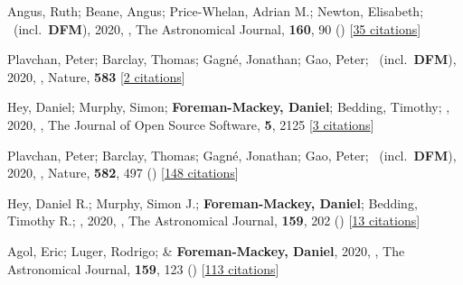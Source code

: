 \item[{\color{numcolor}\scriptsize58}] Angus, Ruth; Beane, Angus; Price-Whelan, Adrian M.; Newton, Elisabeth; \etal\ (incl.\ \textbf{DFM}), 2020, , The Astronomical Journal, \textbf{160}, 90 () [\href{https://ui.adsabs.harvard.edu/abs/2020AJ....160...90A}{35 citations}]

\item[{\color{numcolor}\scriptsize57}] Plavchan, Peter; Barclay, Thomas; Gagn{\'e}, Jonathan; Gao, Peter; \etal\ (incl.\ \textbf{DFM}), 2020, , Nature, \textbf{583} [\href{https://ui.adsabs.harvard.edu/abs/2020Natur.583E..31P}{2 citations}]

\item[{\color{numcolor}\scriptsize56}] Hey, Daniel; Murphy, Simon; \textbf{Foreman-Mackey, Daniel}; Bedding, Timothy; \etal, 2020, , The Journal of Open Source Software, \textbf{5}, 2125 [\href{https://ui.adsabs.harvard.edu/abs/2020JOSS....5.2125H}{3 citations}]

\item[{\color{numcolor}\scriptsize55}] Plavchan, Peter; Barclay, Thomas; Gagn{\'e}, Jonathan; Gao, Peter; \etal\ (incl.\ \textbf{DFM}), 2020, , Nature, \textbf{582}, 497 () [\href{https://ui.adsabs.harvard.edu/abs/2020Natur.582..497P}{148 citations}]

\item[{\color{numcolor}\scriptsize54}] Hey, Daniel R.; Murphy, Simon J.; \textbf{Foreman-Mackey, Daniel}; Bedding, Timothy R.; \etal, 2020, , The Astronomical Journal, \textbf{159}, 202 () [\href{https://ui.adsabs.harvard.edu/abs/2020AJ....159..202H}{13 citations}]

\item[{\color{numcolor}\scriptsize53}] Agol, Eric; Luger, Rodrigo; \& \textbf{Foreman-Mackey, Daniel}, 2020, , The Astronomical Journal, \textbf{159}, 123 () [\href{https://ui.adsabs.harvard.edu/abs/2020AJ....159..123A}{113 citations}]

